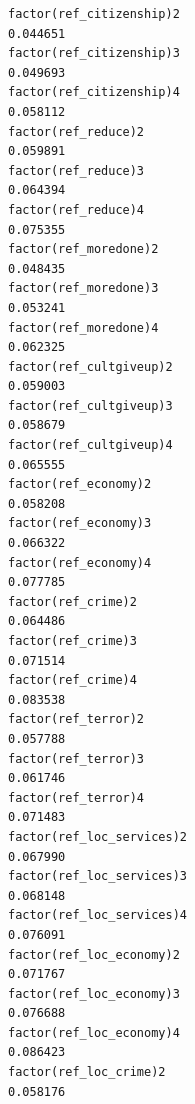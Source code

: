 \documentclass[
]{article}
\begin{document}
\begin{table}
\begin{minipage}[t]{\linewidth}
{\begin{verbatim}
factor(ref_citizenship)2                                                            0.044651
factor(ref_citizenship)3                                                            0.049693
factor(ref_citizenship)4                                                            0.058112
factor(ref_reduce)2                                                                 0.059891
factor(ref_reduce)3                                                                 0.064394
factor(ref_reduce)4                                                                 0.075355
factor(ref_moredone)2                                                               0.048435
factor(ref_moredone)3                                                               0.053241
factor(ref_moredone)4                                                               0.062325
factor(ref_cultgiveup)2                                                             0.059003
factor(ref_cultgiveup)3                                                             0.058679
factor(ref_cultgiveup)4                                                             0.065555
factor(ref_economy)2                                                                0.058208
factor(ref_economy)3                                                                0.066322
factor(ref_economy)4                                                                0.077785
factor(ref_crime)2                                                                  0.064486
factor(ref_crime)3                                                                  0.071514
factor(ref_crime)4                                                                  0.083538
factor(ref_terror)2                                                                 0.057788
factor(ref_terror)3                                                                 0.061746
factor(ref_terror)4                                                                 0.071483
factor(ref_loc_services)2                                                           0.067990
factor(ref_loc_services)3                                                           0.068148
factor(ref_loc_services)4                                                           0.076091
factor(ref_loc_economy)2                                                            0.071767
factor(ref_loc_economy)3                                                            0.076688
factor(ref_loc_economy)4                                                            0.086423
factor(ref_loc_crime)2                                                              0.058176

\end{verbatim}}
\end{minipage}
\end{table}
\end{document}
